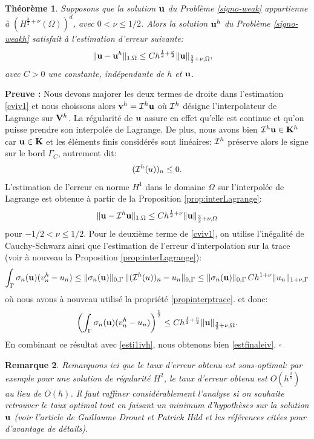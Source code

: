 \documentclass[11pt]{book}
\newtheorem{theorem}{Théorème}[section]
\newtheorem{remark}[theorem]{Remarque}
\newcommand{\bt}{\begin{theorem}}
\newcommand{\et}{\end{theorem}}
\newcommand{\br}{\begin{remark}}
\newcommand{\er}{\end{remark}}
\newcommand{\pf}{\textbf{Preuve : }}
\newcommand{\cqfd}{{$\mbox{}$\hfill$\square$}}
\def\u{{\bf u}}
\def\vv{{\bf v}}
\def\V{{\bf V}}
\def\K{{\bf K}}
\newcommand{\caI}{{\cal I}}
\begin{document}
\bt
\label{cviv2t}
Supposons que la solution $\u$ du Problème \eqref{signo-weak} appartienne à
$(H^{\frac32+\nu} (\Omega))^d$, avec $0 < \nu \le 1/2$.
Alors la solution $\u^h$ 
du Problème \eqref{signo-weakh}
satisfait à l'estimation d'erreur suivante:
\begin{align}
\label{estfinaleiv}
\begin{aligned}
& \| \u - \u^h \|_{1,\Omega} 
 \leq C %
h^{\frac12+\frac\nu2} %
   \| \u \|_{\frac32+\nu,\Omega},
\end{aligned}
\end{align}
avec $C > 0$ une constante, indépendante de $h$ et $\u$.
\et

\pf
Nous devons majorer les deux termes de droite dans l'estimation \eqref{cviv1} et nous choissons alors $\vv^h = \caI^h \u$ où $\caI^h$ désigne l'interpolateur de Lagrange sur $\V^h$. La régularité de $\u$ assure en effet qu'elle est continue et qu'on puisse prendre son interpolée de Lagrange. De plus, nous avons bien $\caI^h \u \in \K^h$ car $\u \in \K$ et les éléments finis considérés sont linéaires: $\caI^h$ préserve alors le signe sur le bord $\Gamma_C$, autrement dit:
\[
( \caI^h (u) )_n \leq 0. 
\]
L'estimation de l'erreur en norme $H^1$ dans le domaine $\Omega$ sur l'interpolée de Lagrange est obtenue à partir de la Proposition \ref{prop:interLagrange}:
\begin{equation}
  \| \u - \caI^h \u \|_{1,\Omega} \leq C h^{\frac12+\nu}  \| \u \|_{\frac32+\nu,\Omega} \label{esti1ivh}
 \end{equation}
pour $-1/2 < \nu \le 1/2$.
Pour le deuxième terme de \eqref{cviv1}, on utilise l'inégalité de Cauchy-Schwarz ainsi que l'estimation de l'erreur d'interpolation sur la trace (voir à nouveau la Proposition \ref{prop:interLagrange}):
\[ \int_\Gamma \sigma_n (\u) ( v^h_n - u_n) 
\leq \| \sigma_n (\u) \|_{0,\Gamma}\, \| (\caI^h (u) )_n - u_n \|_{0,\Gamma}
\leq \| \sigma_n (\u) \|_{0,\Gamma}\, C h^{1+\nu} \|  u_n \|_{1+\nu,\Gamma}
\]
où nous avons à nouveau utilisé la propriété \ref{propinterptrace}. %
et donc:
\[ \left ( \int_\Gamma \sigma_n (\u) ( v^h_n - u_n) \right )^{\frac12}
\leq %
C h^{\frac12+\frac\nu2} \|  \u \|_{\frac32+\nu,\Omega}.
\]
En combinant ce résultat avec \eqref{esti1ivh}, nous obtenons bien \eqref{estfinaleiv}.
\cqfd

\br Remarquons ici que le taux d'erreur obtenu est sous-optimal: par exemple pour une solution de régularité $H^2$, le taux d'erreur obtenu est $O(h^{\frac34})$ au lieu de $O(h)$. Il faut raffiner considérablement l'analyse si on souhaite retrouver le taux optimal tout en faisant un minimum d'hypothèses sur la solution $\u$ (voir l'article de Guillaume Drouet et Patrick Hild \cite{drouet-hild-15} et les références citées pour d'avantage de détails).
\er
\end{document}
